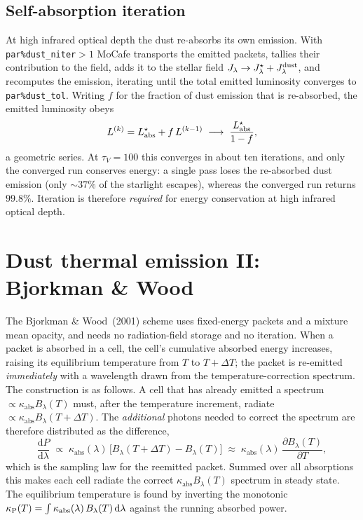 \documentclass[english,a4paper]{kiseon_memo}
\newcommand{\kabs}{\kappa_{\mathrm{abs}}}
\newcommand{\Jlam}{J_\lambda}
\newcommand{\dd}{\mathrm{d}}
\newcommand{\pp}[1]{\texttt{par\%#1}}
\begin{document}
\subsection{Self-absorption iteration}
At high infrared optical depth the dust re-absorbs its own emission.  With
\pp{dust\_niter}$>1$ MoCafe transports the emitted packets, tallies their
contribution to the field, adds it to the stellar field
$\Jlam\to\Jlam^{\star}+\Jlam^{\rm dust}$, and recomputes the emission, iterating
until the total emitted luminosity converges to \pp{dust\_tol}.  Writing $f$ for
the fraction of dust emission that is re-absorbed, the emitted luminosity obeys
\begin{equation}
  L^{(k)} = L_{\rm abs}^{\star} + f\,L^{(k-1)}
  \;\longrightarrow\;
  \frac{L_{\rm abs}^{\star}}{1-f},
\end{equation}
a geometric series.  At $\tau_V=100$ this converges in about ten iterations, and
only the converged run conserves energy: a single pass loses the re-absorbed
dust emission (only $\sim37\%$ of the starlight escapes), whereas the converged
run returns $99.8\%$.  Iteration is therefore \emph{required} for energy
conservation at high infrared optical depth.

\section{Dust thermal emission II: Bjorkman \& Wood}\label{sec:bw}

The Bjorkman \& Wood~(2001) scheme uses fixed-energy packets and a mixture mean
opacity, and needs no radiation-field storage and no iteration.  When a packet is
absorbed in a cell, the cell's cumulative absorbed energy increases, raising its
equilibrium temperature from $T$ to $T+\Delta T$; the packet is re-emitted
\emph{immediately} with a wavelength drawn from the temperature-correction
spectrum.  The construction is as follows.  A cell that has already emitted a
spectrum $\propto\kabs B_\lambda(T)$ must, after the temperature increment,
radiate $\propto\kabs B_\lambda(T+\Delta T)$.  The \emph{additional} photons
needed to correct the spectrum are therefore distributed as the difference,
\begin{equation}
  \frac{\dd P}{\dd\lambda}\;\propto\;
     \kabs(\lambda)\,\big[B_\lambda(T{+}\Delta T)-B_\lambda(T)\big]
  \;\approx\;
     \kabs(\lambda)\,\frac{\partial B_\lambda(T)}{\partial T},
  \label{eq:bwcorr}
\end{equation}
which is the sampling law for the reemitted packet.  Summed over all absorptions
this makes each cell radiate the correct $\kabs B_\lambda(T)$ spectrum in steady
state.  The equilibrium temperature is found by inverting the monotonic
$\kappa_{\rm P}(T)=\int\kabs(\lambda)\,B_\lambda(T)\,\dd\lambda$ against the
running absorbed power.
\end{document}
